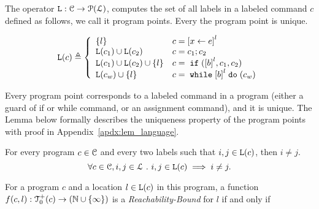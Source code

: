 The operator $\mathtt{L}: \mathcal{C} \to \mathcal{P}(\mathcal{L})$,
computes the set of all labels
in a labeled command $c$ defined as follows, we call it program points.
Every the program point is unique.
\begin{defn}
\label{def:lvar}
{\small
\[
  \lvar(c) \triangleq
  \left\{
  \begin{array}{ll}
      \{l\}                  
      & {c} = \clabel{\assign x \expr}^{l} 
      \\
      \lvar({c_1}) \cup \lvar({{c_2}}) 
      & {c} = {c_1};{c_2}
      \\
      \lvar(c_1) \cup \lvar({{c_2}}) \cup \{l\} 
      & {c} =\eif(\clabel{\bexpr}^{l}, c_1, c_2) 
      \\
      \lvar(c_w) \cup \{l\} 
      & {c}   = \ewhile \clabel{\bexpr}^{l} \edo (c_w)
\end{array}
\right.
\]
}
\end{defn}
%
Every program point corresponds to a labeled command in a program (either a guard of if or while command, or an assignment command), and it is unique.
The Lemma below formally describes the uniqueness property of the program points
with proof in Appendix~\ref{apdx:lem_language}.
\begin{lem}
  \label{lem:label_unique}
  For every program $c \in \mathcal{C}$ and every two labels such that
  $i, j \in \mathtt{L}(c)$, then $i \neq j$.
  \[
    \forall c \in \mathcal{C}, i, j \in \mathcal{L} ~.~ i, j \in \mathtt{L}(c)\implies i \neq j.
  \]
\end{lem}
%
%
\begin{defn}
  \label{def:rb}
  For a program ${c}$ and a location $l \in \mathtt{L}(c)$ in this program,
a function $f(c, l) : \mathcal{T}^{+}_0(c) \to (\mathbb{N} \cup \{\infty\})$ is a \emph{Reachability-Bound} for $l$ if and only if
\end{defn}
